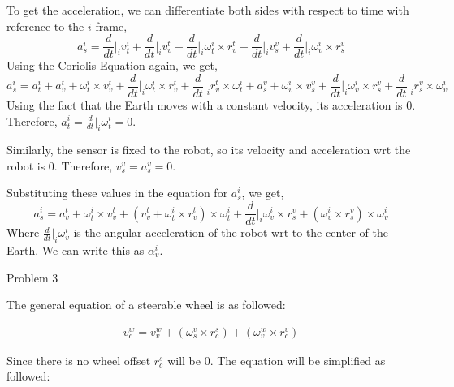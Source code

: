 \documentclass[answers]{exam}
\begin{document}
\begin{questions}
\begin{solution}
\begin{equation*}
        \end{equation*}
        To get the acceleration, we can differentiate both sides with respect to time with reference to the $i$ frame,
        \begin{equation*}
            a^i_s  =  \dfrac{d}{dt}\Big|_i v^i_t + \frac{d}{dt}\Big|_i v^t_v +\frac{d}{dt}\Big|_i \omega^i_t \times r^t_v +\frac{d}{dt}\Big|_i v^v_s + \frac{d}{dt}\Big|_i \omega^i_v \times r^v_s
        \end{equation*}
        Using the Coriolis Equation again, we get,
        \begin{equation*}
            a^i_s  =  a^i_t + a^t_v + \omega^i_t \times v^t_v + \frac{d}{dt}\Big|_i \omega^i_t \times r^t_v + \frac{d}{dt}\Big|_i r^t_v \times \omega^i_t + a^v_s + \omega^i_v \times v^v_s + \frac{d}{dt}\Big|_i \omega^i_v \times r^v_s + \frac{d}{dt}\Big|_i r^v_s \times \omega^i_v
        \end{equation*}
        Using the fact that the Earth moves with a constant velocity, its acceleration is 0. Therefore, $a^i_t = \frac{d}{dt}\Big|_i \omega^i_t = 0$.

        Similarly, the sensor is fixed to the robot, so its velocity and acceleration
        wrt the robot is 0. Therefore, $v^v_s = a^v_s = 0$.

        Substituting these values in the equation for $a^i_s$, we get,
        \begin{equation*}
            a^i_s  =  a^t_v + \omega^i_t \times v^t_v + (v^t_v + \omega^i_t \times r^t_v) \times \omega^i_t + \frac{d}{dt}\Big|_i \omega^i_v \times r^v_s + (\omega^i_v \times r^v_s) \times \omega^i_v
        \end{equation*}
        Where $\frac{d}{dt}\Big|_i \omega^i_v$ is the angular acceleration of the robot wrt to the center of the Earth. We can write this as $\alpha^i_v$.
    \end{solution}

    \question Problem 3
    \begin{solution}

        The general equation of a steerable wheel is as followed:

        \begin{align*}
            v^w_c = v^w_v + ({\omega}^v_s \times r^s_c) + ({\omega}^w_v \times r^v_c)
        \end{align*}

        Since there is no wheel offset $r^s_c$ will be 0. The equation will be
        simplified as followed:


\end{solution}
\end{questions}
\end{document}
